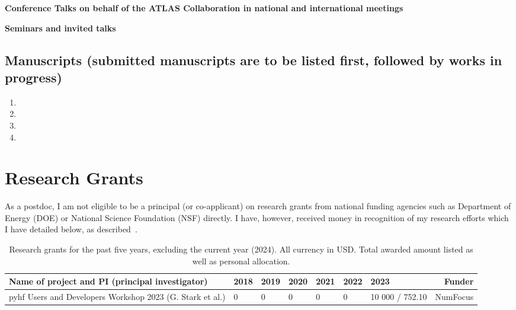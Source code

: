 \textbf{Conference Talks on behalf of the ATLAS Collaboration in national and international meetings}

\textbf{Seminars and invited talks}

\subsection{Manuscripts (submitted manuscripts are to be listed first, followed by works in progress)}\label{ssec:manuscripts-submitted-manuscripts-are-to-be-listed-first-followed-by-works-in-progress}

\begin{enumerate}[label=\PubCite{red}{white}{\arabic*},resume]
  \item {}
  \item {}
  \item {}
  \item {}
\end{enumerate}

\section{Research Grants} \label{sec:research-grants}

As a postdoc, I am not eligible to be a principal (or co-applicant) on research grants from national funding agencies such as Department of Energy (DOE) or National Science Foundation (NSF) directly. I have, however, received money in recognition of my research efforts which I have detailed below, as described~.

\begin{table}[h!]
	\footnotesize
	\centering
	\caption{Research grants for the past five years, excluding the current year (2024). All currency in USD. Total awarded amount listed as well as personal allocation.}
	\begin{tabular}{p{8em}|p{4em}|p{4em}|p{4em}|p{4em}|p{4em}|p{4em}|r}
		\rowcolor{black!30}
		\textbf{Name of project and PI (principal investigator)}  & \textbf{2018} & \textbf{2019} & \textbf{2020} & \textbf{2021} & \textbf{2022} & \textbf{2023}   & \textbf{Funder} \\
		\hline
		pyhf Users and Developers Workshop 2023 (G. Stark et al.) & 0             & 0             & 0             & 0             & 0             & 10 000 / 752.10 & NumFocus        \\
	\end{tabular}
\end{table}
